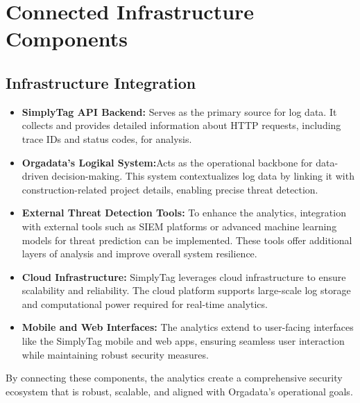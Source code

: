%
%

\chapter{Connected Infrastructure Components}

\section{Infrastructure Integration}

\begin{itemize}
	\item \textbf{SimplyTag API Backend:} Serves as the primary source for log data. It collects and provides detailed information about HTTP requests, including trace IDs and status codes, for analysis.
	\item \textbf{Orgadata’s Logikal System:}Acts as the operational backbone for data-driven decision-making. This system contextualizes log data by linking it with construction-related project details, enabling precise threat detection.
	\item \textbf{External Threat Detection Tools:} To enhance the analytics, integration with external tools such as SIEM platforms or advanced machine learning models for threat prediction can be implemented. These tools offer additional layers of analysis and improve overall system resilience.
	\item \textbf{Cloud Infrastructure:} SimplyTag leverages cloud infrastructure to ensure scalability and reliability. The cloud platform supports large-scale log storage and computational power required for real-time analytics.
	\item \textbf{Mobile and Web Interfaces:} The analytics extend to user-facing interfaces like the SimplyTag mobile and web apps, ensuring seamless user interaction while maintaining robust security measures.
\end{itemize}

By connecting these components, the analytics create a comprehensive security ecosystem that is robust, scalable, and aligned with Orgadata’s operational goals.
  
  
  
   
  
   

 